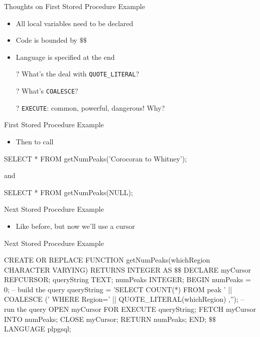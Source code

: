 \documentclass[aspectratio=169]{beamer}
\newenvironment{noindentitemize}
{ \begin{itemize}
  \setlength{\itemsep}{1.5ex}
  \setlength{\parskip}{0pt}
  \setlength{\parsep}{0pt}   
  \addtolength{\itemindent}{-2em}  }
{ \end{itemize} }
\begin{document}
\begin{frame}[fragile]{Thoughts on First Stored Procedure Example}


\begin{itemize}
	\item All local variables need to be declared
	\item Code is bounded by $\textbf{\$\$}$ 
	\item Language is specified at the end
	\item[?] What's the deal with \texttt{QUOTE\_LITERAL}?
	\item[?] What's \texttt{COALESCE}?
	\item[?] \texttt{EXECUTE}: common, powerful, dangerous! Why?
\end{itemize}
\end{frame}

\begin{frame}[fragile]{First Stored Procedure Example}

\begin{noindentitemize}
	\item[] Then to call
\end{noindentitemize}

\begin{SQL}
SELECT * FROM getNumPeaks('Corocoran to Whitney');
\end{SQL}

and 

\begin{SQL}
SELECT * FROM getNumPeaks(NULL);
\end{SQL}
\end{frame}


\begin{frame}[fragile]{Next Stored Procedure Example}

\begin{itemize}
\item Like before, but now we'll use a cursor
\end{itemize}

\end{frame}

\begin{frame}[fragile]{Next Stored Procedure Example}

\begin{SQL}
CREATE OR REPLACE FUNCTION 
   getNumPeaks(whichRegion CHARACTER VARYING) RETURNS INTEGER AS
$\textbf{\$\$}$
DECLARE
  myCursor REFCURSOR;
  queryString TEXT;
  numPeaks INTEGER;
BEGIN
  numPeaks = 0;
  -- build the query
  queryString = 'SELECT COUNT(*) FROM peak ' || COALESCE (' WHERE Region=' || 
       QUOTE_LITERAL(whichRegion) ,'');
  -- run the query
  OPEN myCursor FOR EXECUTE queryString;
  FETCH  myCursor INTO numPeaks;
  CLOSE myCursor;
  RETURN numPeaks;
END;
$\textbf{\$\$}$
LANGUAGE plpgsql;
\end{SQL}
\end{frame}
\end{document}
